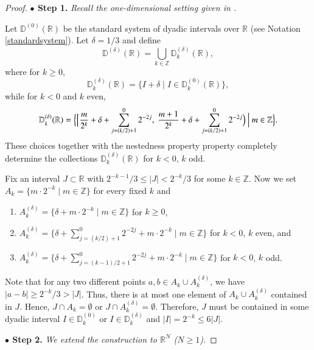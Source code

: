 \documentclass[12pt]{amsart}
\begin{document}
\begin{proof}
{\bf $\bullet$ Step 1.}  {\it Recall the one-dimensional setting given in \cite[Section 2]{MR3420475}.}

Let $\mathbb{D}^{(0)}(\mathbb{R})$ be the standard system of dyadic intervals over $\mathbb{R}$ (see Notation \ref{standardsystem}).
Let $\delta=1/3$ and define
$$
   \mathbb D^{(\delta)}(\mathbb R)=\bigcup_{k\in\mathbb Z} \mathbb D^{(\delta)}_k(\mathbb R),
$$
where for $k\geq0$,
$$
    \mathbb D^{(\delta)}_k(\mathbb R)=\{I+\delta \mid I\in \mathbb D_k^{(0)}(\mathbb R)\},
$$
while for $k<0$ and $k$ even,
$$
    \mathbb D^{(\delta)}_k(\mathbb R)
    =\Big\{\Big[{m\over 2^k}+\delta+\sum_{j=(k/2)+1}^0 2^{-2j},\ {m+1\over 2^k}
    +\delta+\sum_{j=(k/2)+1}^0 2^{-2j}\Big)\ \Big|\ m\in
    \mathbb Z\Big\}.
$$
These choices together with the nestedness property property completely
determine the collections $\mathbb D^{(\delta)}_k(\mathbb R)$ for $k<0$, $k$ odd.

Fix an interval $J\subset\mathbb R$ with $2^{-k-1}/3\le |J|<2^{-k}/3$ for some $k\in\mathbb Z$. Now we set
$A_k=\{ m\cdot 2^{-k} \mid m\in\mathbb Z \}$ for every fixed $k$ and
\begin{enumerate}
    \item[(1)]$A_k^{(\delta)}=\{ \delta+ m\cdot 2^{-k} \mid m\in\mathbb Z
        \}$ for $k\geq 0$,

    \item[(2)]$A_k^{(\delta)}=\{ \delta+
        \sum_{j=(k/2)+1}^{0}2^{-2j}+ m\cdot 2^{-k} \mid m\in\mathbb Z
        \}$ for $k<0$, $k$ even, and

    \item[(3)]$A_k^{(\delta)}=\{ \delta+
        \sum_{j=(k-1)/2+1}^{0}2^{-2j}+ m\cdot 2^{-k} \mid
        m\in\mathbb Z \}$ for $k<0$, $k$ odd.
\end{enumerate}
Note that for any two different points $a,b\in A_k\cup
A_k^{(\delta)}$, we have $|a-b|\geq 2^{-k}/3>|J|$. Thus,
there is at most one element of $A_k\cup A_k^{(\delta)}$ contained in
$J$. Hence, $J\cap A_k=\emptyset $ or $J\cap
A_k^{(\delta)}=\emptyset $. Therefore, $J$ must be contained in
some dyadic interval $I\in \mathbb D_k^{(0)}$ or $I\in \mathbb D^{(\delta)}_k$ and
$|I|=2^{-k}\leq 6 |J|$.

{\bf $\bullet$ Step 2.} {\it We extend the construction to $\mathbb{R}^N$ ($N\geq 1$).}


\end{proof}
\end{document}
